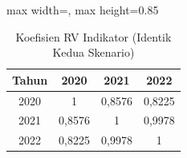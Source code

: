 \begin{table}[H]
\centering
\caption{Koefisien RV Indikator (Identik Kedua Skenario)} \label{tab:samplerv_s}
\begin{adjustbox}{max width=\textwidth, max height=0.85\textheight}
\begin{tabular}{|c|c|c|c|}
\hline
\textbf{Tahun} & \textbf{2020} & \textbf{2021} & \textbf{2022} \\
\hline
2020 & 1 & 0,8576 & 0,8225 \\
2021 & 0,8576 & 1 & 0,9978 \\
2022 & 0,8225 & 0,9978 & 1 \\
\hline
\end{tabular}
\end{adjustbox}
\end{table}